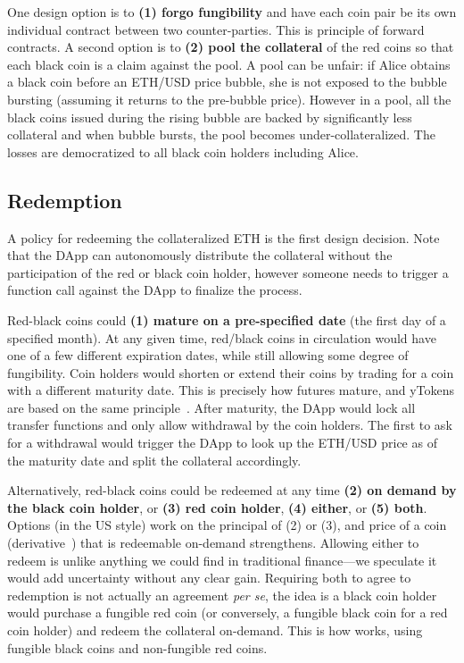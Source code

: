 One design option is to \textbf{(1) forgo fungibility} and have each coin pair be its own individual contract between two counter-parties. This is principle of forward contracts. A second option is to \textbf{(2) pool the collateral} of the red coins so that each black coin is a claim against the pool. A pool can be unfair: if Alice obtains a black coin before an ETH/USD price bubble, she is not exposed to the bubble bursting (assuming it returns to the pre-bubble price). However in a pool, all the black coins issued during the rising bubble are backed by significantly less collateral and when bubble bursts, the pool becomes under-collateralized. The losses are democratized to all black coin holders including Alice. 


\subsection{Redemption}
\label{sec:maturity}

A policy for redeeming the collateralized ETH is the first design decision. Note that the DApp can autonomously distribute the collateral without the participation of the red or black coin holder, however someone needs to trigger a function call against the DApp to finalize the process.

 Red-black coins could \textbf{(1) mature on a pre-specified date} (\eg the first day of a specified month). At any given time, red/black coins in circulation would have one of a few different expiration dates, while still allowing some degree of fungibility. Coin holders would shorten or extend their coins by trading for a coin with a different maturity date. This is precisely how futures mature, and yTokens are based on the same principle~\cite{RoNi20}. After maturity, the DApp would lock all transfer functions and only allow withdrawal by the coin holders. The first to ask for a withdrawal would trigger the DApp to look up the ETH/USD price as of the maturity date and split the collateral accordingly. 

Alternatively, red-black coins could be redeemed at any time \textbf{(2) on demand by the black coin holder}, or \textbf{(3) red coin holder}, \textbf{(4) either}, or \textbf{(5) both}. Options (in the US style) work on the principal of (2) or (3), and price of a coin (\cf derivative~\cite{Sey09}) that is redeemable on-demand strengthens. Allowing either to redeem is unlike anything we could find in traditional finance---we speculate it would add uncertainty without any clear gain. Requiring both to agree to redemption is not actually an agreement \textit{per se}, the idea is a black coin holder would purchase a fungible red coin (or conversely, a fungible black coin for a red coin holder) and redeem the collateral on-demand. This is how \dai works, using fungible black coins and non-fungible red coins. 

